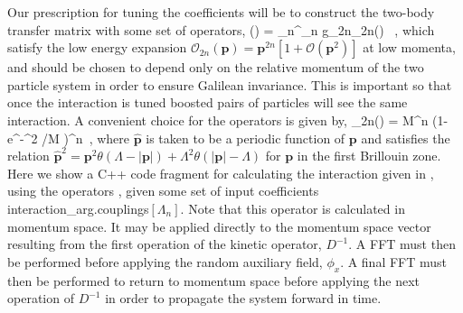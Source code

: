 Our prescription for tuning the coefficients will be to construct the two-body transfer matrix with some set of operators,
\beq
\label{eq:tuningcoef}
() = \sum_n^{\Lambda_n} g_{2n}{}_{2n}() \ ,
\eeq
which satisfy the low energy expansion ${\mathcal{ O}}_{2n}(\mathbf{p}) = \mathbf{p}^{2n} \left[ 1 + {\mathcal{ O}}(\mathbf{p}^2) \right]$ at low momenta, and should be chosen to depend only on the relative momentum of the two particle system in order to ensure Galilean invariance. This is important so that once the interaction is tuned boosted pairs of particles will see the same interaction. A convenient choice for the operators is given by,
\beq
\label{eq:Ofunc}
{}_{2n}() = M^n \left(1-e^{-^2 /M}
\right)^n\ , \eeq 
where $\hat{\mathbf{p}}$ is taken to be a periodic
function of $\mathbf{p}$ and satisfies the relation $\hat{\mathbf{p}}^2 =\mathbf{p}^2 \theta(\Lambda-|\mathbf{p}|) + \Lambda^2 \theta(|\mathbf{p}| -\Lambda)$ for $\mathbf{p}$ in the first Brillouin zone. Here we show a
C++ code fragment for calculating the interaction given in
, using the operators , given some set of
input coefficients interaction\_arg.couplings$[\Lambda_n]$. Note that
this operator is calculated in momentum space. It may be applied
directly to the momentum space vector resulting from the first
operation of the kinetic operator, $D^{-1}$. A FFT must then be
performed before applying the random auxiliary field, $\phi_x$. A
final FFT must then be performed to return to momentum space before
applying the next operation of $D^{-1}$ in order to propagate the
system forward in time.
